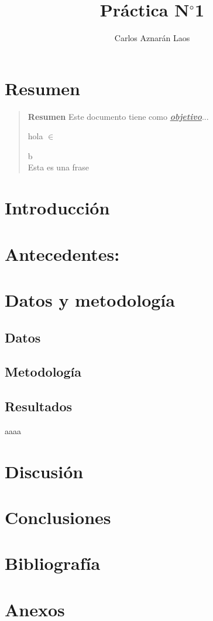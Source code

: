 \documentclass[12pt,a4paper,openany]{book}
\author{Carlos Aznarán Laos}
\title{Práctica N$^{\circ}$1}
\begin{document}
\maketitle
\chapter*{Resumen}
\begin{quotation}
\textbf{Resumen}
Este documento tiene como  \huge{\textbf{\underline{\textit{objetivo}}}}...
\begin{center}
hola $ \in $
\end{center}
\begin{flushright}
b\\ Esta es una frase
\end{flushright}
\end{quotation}
\pagebreak
\chapter{Introducción}
\chapter{Antecedentes:}
\chapter{Datos y metodología}
\section{Datos}
\section{Metodología}

\begin{landscape}
\chapter{Resultados}
\huge{aaaa}
\end{landscape}
\pagebreak

\chapter{Discusión}
\chapter{Conclusiones}
\chapter*{Bibliografía}
\chapter*{Anexos}
\end{document}
